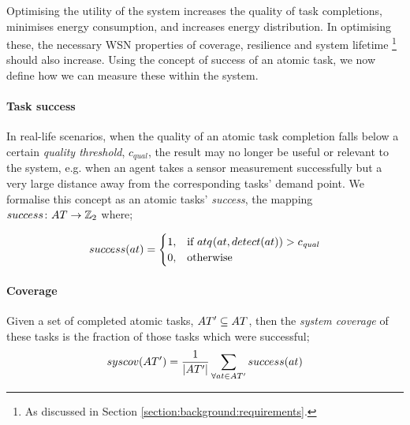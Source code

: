 Optimising the utility of the system increases the quality of task completions, minimises energy consumption, and increases energy distribution. In optimising these, the necessary WSN properties of coverage, resilience and system lifetime \footnote{As discussed in Section \ref{section:background:requirements}.} should also increase. Using the concept of success of an atomic task, we now define how we can measure these within the system.

\newcommand{\varQualityMin}[2]{c_{\textit{qual}}}

\newcommand{\formalAtomicTaskSuccess}[2]{
	\functionFormal{success}
	{\setAtomicTask{}{}}
	{\setIntegersBinary{}{}}
}
\newcommand{\functionAtomicTaskSuccess}[2]{
	\functionSignature{success}{\varAtomicTask{}{}}
}

\newcommand{\formalCompositeTaskCoverage}[2]{
	\functionFormal{taskcov}
	{\setCompositeTask{}{}}
	{\setRealNumbersUnit{}{}}
}
\newcommand{\functionCompositeTaskCoverage}[2]{
	\functionSignature{taskcov}{\varCompositeTask{}{}}
}


\newcommand{\functionSystemCoverage}[2]{
	\functionSignature{syscov}{\setAtomicTaskInstance{}{}}
}

\paragraph{Task success}
\label{section:success}
In real-life scenarios, when the quality of an atomic task completion falls below a certain \textit{quality threshold}, $\varQualityMin{}{}$, the result may no longer be useful or relevant to the system, e.g. when an agent takes a sensor measurement successfully but a very large distance away from the corresponding tasks' demand point.  We formalise this concept as an atomic tasks' \textit{success}, the mapping $\formalAtomicTaskSuccess{}{}$ where;

\begin{equation}
	 \functionAtomicTaskSuccess{}{}
	 = 
	\begin{cases}
		1, & \text{if } \functionAtomicTaskQualitySensor{}{} > \varQualityMin{}{} \\
		0, & \text{otherwise}
	\end{cases}
\end{equation}

\paragraph{Coverage}
\label{section:coverage}
Given a set of completed atomic tasks, $\setAtomicTaskInstance{}{} \subseteq \setAtomicTask{}{}$, then the \textit{system coverage} of these tasks is the fraction of those tasks which were successful;
\begin{equation}
	\label{eq:coverage}
	\functionSystemCoverage{}{}
	=
	\frac{1}{\funcSize{\setAtomicTaskInstance{}{}}}
	\sum\limits_{\forall \varAtomicTask{}{} \in \setAtomicTaskInstance{}{}}
	\functionAtomicTaskSuccess{}{}
\end{equation}

